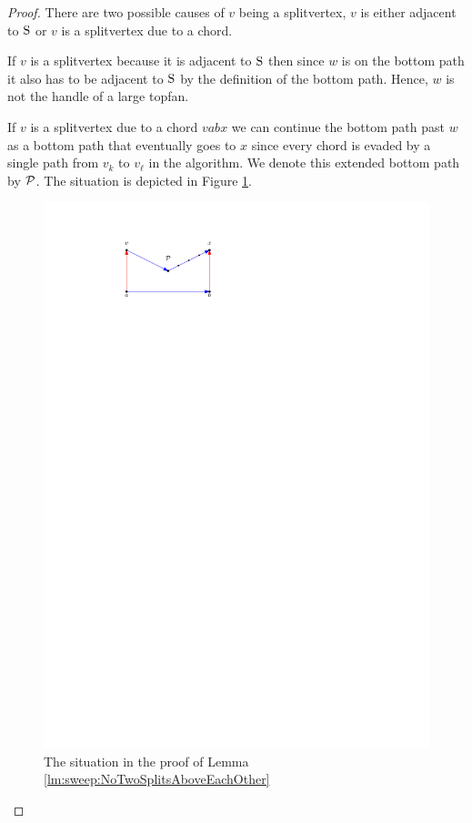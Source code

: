     \begin{proof}
      There are two possible causes of $v$ being a splitvertex, $v$ is either adjacent to $\pS$ or $v$ is a splitvertex due to a chord.

      If $v$ is a splitvertex because it is adjacent to $\pS$ then since $w$ is on the bottom path it also has to be adjacent to $\pS$ by the definition of the bottom path.
      Hence, $w$ is not the handle of a large topfan.

      If $v$ is a splitvertex due to a chord $v a b x$ we can continue the bottom path past $w$ as a bottom path that eventually goes to $x$ since every chord is evaded by a single path from $v_k$ to $v_\ell$ in the algorithm.
      We denote this extended bottom path by $\P$.
      The situation is depicted in Figure \ref{fig:sweep:botomPathChord}.

      \begin{figure}[b]
        \centering
        \includegraphics[scale=1]{unifiedAlgo/img/sweep/bottompathChord.pdf}
        \caption{The situation in the proof of Lemma \ref{lm:sweep:NoTwoSplitsAboveEachOther}}
        \label{fig:sweep:botomPathChord}
      \end{figure}


\end{proof}
